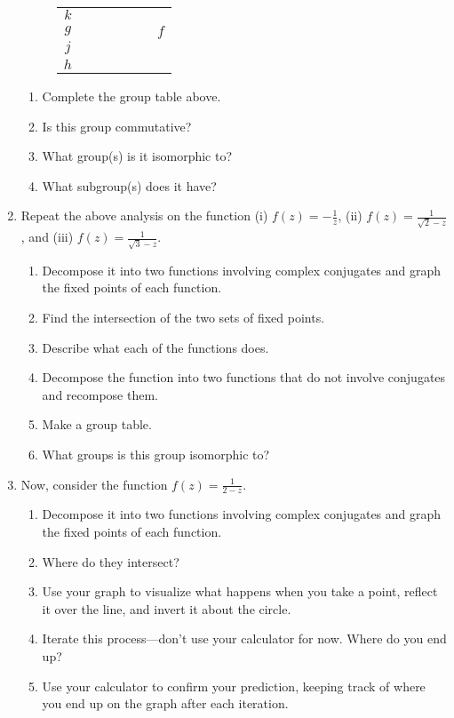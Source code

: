 \documentclass[../gatm.tex]{subfiles}
\begin{document}
\begin{enumerate}
\begin{figure}[h]
\begin{center}
\begin{minipage}[b]{\textwidth}
\begin{tabular}{c|cccccc}
				\rowcolor{light-gray}
				$k$ & & & & & & \\
				$g$ & & & & & & $f$\\
				\rowcolor{light-gray}
				$j$ & & & & & & \\
				$h$ & & & & & & \\ \hline
			\end{tabular}
		\end{minipage}
	\end{center}
\end{figure}
\begin{enumerate}
\item Complete the group table above.
\item Is this group commutative?
\item What group(s) is it isomorphic to?
\item What subgroup(s) does it have?
\end{enumerate}
\item Repeat the above analysis on the function (i) $f(z)=-\frac{1}{z}$, (ii) $f(z)=\frac{1}{\sqrt{2}-z}$, and (iii) $f(z)=\frac{1}{\sqrt{3}-z}$.
\begin{enumerate}
\item Decompose it into two functions involving complex conjugates and graph the fixed points of each function.
\item Find the intersection of the two sets of fixed points.
\item Describe what each of the functions does.
\item Decompose the function into two functions that do not involve conjugates and recompose them.
\item Make a group table.
\item What groups is this group isomorphic to?
\end{enumerate}
\item Now, consider the function $f(z)=\frac{1}{2-z}$.
\begin{enumerate}
\item Decompose it into two functions involving complex conjugates and graph the fixed points of each function.
\item Where do they intersect?
\item Use your graph to visualize what happens when you take a point, reflect it over the line, and invert it about the circle.
\item Iterate this process---don't use your calculator for now. Where do you end up?
\item Use your calculator to confirm your prediction, keeping track of where you end up on the graph after each iteration.

\end{enumerate}
\end{enumerate}
\end{document}
